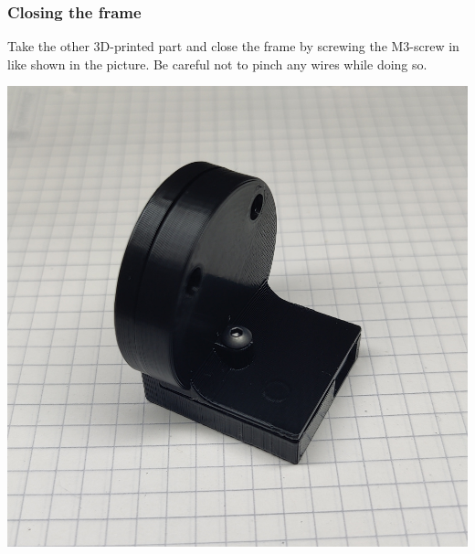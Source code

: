 \documentclass[]{article}
\begin{document}
\subsubsection{Closing the frame}
\begin{minipage}[t]{0.5\linewidth}
	\vspace{0pt}
	Take the other 3D-printed part and close the frame by screwing the M3-screw in like shown in the picture. Be careful not to pinch any wires while doing so.
\end{minipage}
\hfill
\begin{minipage}[t]{0.4\linewidth}
	\vspace{0pt}
	\includegraphics[width=\linewidth]{images/01_displayunit/17_close_frame.jpg}
\end{minipage}
\end{document}
